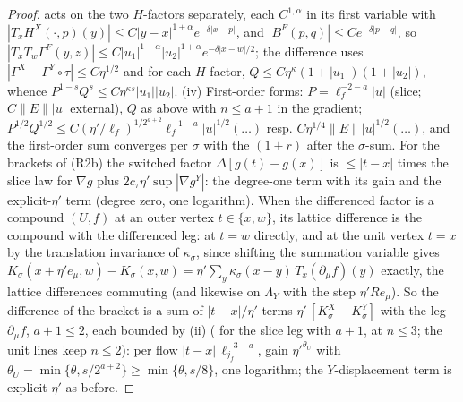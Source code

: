 \begin{proof}
acts on the two $H$-factors separately, each $C^{1,\alpha}$ in its first variable with $|T_xH^X(\cdot,p)(y)|\le C|y-x|^{1+\alpha}e^{-\delta|x-p|}$, and $|B^F(p,q)|\le Ce^{-\delta|p-q|}$, so $|T_xT_w\Gamma^F(y,z)|\le C|u_1|^{1+\alpha}|u_2|^{1+\alpha}e^{-\delta|x-w|/2}$; the difference uses $|\Gamma^X-\Gamma^Y\circ\tau|\le C\eta^{1/2}$ and  for each $H$-factor, $Q\le C\eta^\kappa(1+|u_1|)(1+|u_2|)$, whence $P^{1-s}Q^s\le C\eta^{\kappa s}|u_1||u_2|$. (iv) First-order forms: $P=\ell_f^{-2-a}|u|$ (slice; $C\|E\||u|$ external), $Q$ as above with $n\le a+1$ in the gradient; $P^{1/2}Q^{1/2}\le C(\eta'/\ell_f)^{1/2^{a+2}}\ell_f^{-1-a}|u|^{1/2}(\dots)$ resp. $C\eta^{1/4}\|E\||u|^{1/2}(\dots)$, and the first-order sum converges per $\sigma$ with the $(1+r)$ after the $\sigma$-sum. For the brackets of (R2b) the switched factor $\Delta[g(t)-g(x)]$ is $\le|t-x|$ times the slice law for $\nabla g$ plus $2c_\tau\eta'\sup|\nabla g^Y|$: the degree-one term with its gain and the explicit-$\eta'$ term (degree zero, one logarithm). When the differenced factor is a compound $(U,f)$ at an outer vertex $t\in\{x,w\}$, its lattice difference is the compound with the differenced leg: at $t=w$ directly, and at the unit vertex $t=x$ by the translation invariance of $\kappa_\sigma$, since shifting the summation variable gives $K_\sigma(x+\eta'e_\mu,w)-K_\sigma(x,w)=\eta'\sum_y\kappa_\sigma(x-y)\,T_x(\partial_\mu f)(y)$ exactly, the lattice differences commuting (and likewise on $\Lambda_Y$ with the step $\eta'Re_\mu$). So the difference of the bracket is a sum of $|t-x|/\eta'$ terms $\eta'\,[K^X_\sigma-K^Y_\sigma]$ with the leg $\partial_\mu f$, $a+1\le2$, each bounded by (ii) ( for the slice leg with $a+1$,  at $n\le3$; the unit lines keep $n\le2$): per flow $|t-x|\,\ell_{j_f}^{-3-a}$, gain $\eta'^{\theta_U}$ with $\theta_U=\min\{\theta,s/2^{a+2}\}\ge\min\{\theta,s/8\}$, one logarithm; the $Y$-displacement term is explicit-$\eta'$ as before.
\end{proof}
